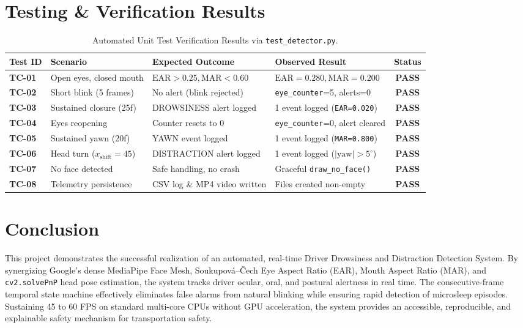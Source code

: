\documentclass[11pt,a4paper]{article}
\begin{document}
\section{Testing \& Verification Results}
\begin{table}[h!]
\centering\small
\begin{tabular}{llllc}
\toprule
\textbf{Test ID} & \textbf{Scenario} & \textbf{Expected Outcome} & \textbf{Observed Result} & \textbf{Status} \\
\midrule
\textbf{TC-01} & Open eyes, closed mouth & $\text{EAR}>0.25, \text{MAR}<0.60$ & $\text{EAR}=0.280, \text{MAR}=0.200$ & \textbf{PASS} \\
\textbf{TC-02} & Short blink (5 frames) & No alert (blink rejected) & \texttt{eye\_counter}=5, alerts=0 & \textbf{PASS} \\
\textbf{TC-03} & Sustained closure (25f) & DROWSINESS alert logged & 1 event logged (\texttt{EAR=0.020}) & \textbf{PASS} \\
\textbf{TC-04} & Eyes reopening & Counter resets to 0 & \texttt{eye\_counter}=0, alert cleared & \textbf{PASS} \\
\textbf{TC-05} & Sustained yawn (20f) & YAWN event logged & 1 event logged (\texttt{MAR=0.800}) & \textbf{PASS} \\
\textbf{TC-06} & Head turn ($x_{\text{shift}}=45$) & DISTRACTION alert logged & 1 event logged ($|\text{yaw}|>5^\circ$) & \textbf{PASS} \\
\textbf{TC-07} & No face detected & Safe handling, no crash & Graceful \texttt{draw\_no\_face()} & \textbf{PASS} \\
\textbf{TC-08} & Telemetry persistence & CSV log \& MP4 video written & Files created non-empty & \textbf{PASS} \\
\bottomrule
\end{tabular}
\caption{Automated Unit Test Verification Results via \texttt{test\_detector.py}.}
\end{table}

\section{Conclusion}
This project demonstrates the successful realization of an automated, real-time Driver Drowsiness and Distraction Detection System. By synergizing Google's dense MediaPipe Face Mesh, Soukupov\'a--\v{C}ech Eye Aspect Ratio (EAR), Mouth Aspect Ratio (MAR), and \texttt{cv2.solvePnP} head pose estimation, the system tracks driver ocular, oral, and postural alertness in real time. The consecutive-frame temporal state machine effectively eliminates false alarms from natural blinking while ensuring rapid detection of microsleep episodes. Sustaining 45 to 60 FPS on standard multi-core CPUs without GPU acceleration, the system provides an accessible, reproducible, and explainable safety mechanism for transportation safety.
\end{document}
